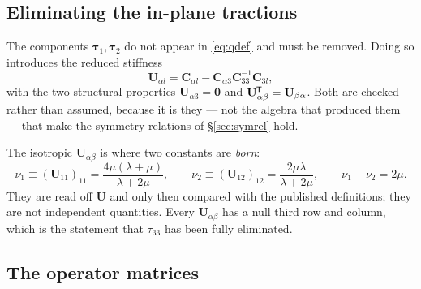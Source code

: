 \documentclass[11pt,a4paper]{article}
\newcommand{\bC}{\mathbf{C}}
\newcommand{\bU}{\mathbf{U}}
\newcommand{\bta}{\boldsymbol{\tau}}
\newcommand{\tp}{^{\mkern-1.5mu\mathsf{T}}}
\begin{document}
\subsection{Eliminating the in-plane tractions}

The components $\bta_1,\bta_2$ do not appear in \eqref{eq:qdef} and must be
removed.  Doing so introduces the reduced stiffness
\begin{equation}\label{eq:U}
  \bU_{\alpha l} = \bC_{\alpha l} - \bC_{\alpha 3}\bC_{33}^{-1}\bC_{3l},
\end{equation}
with the two structural properties $\bU_{\alpha 3} = \mathbf{0}$ and
$\bU_{\alpha\beta}\tp = \bU_{\beta\alpha}$.  Both are checked rather than
assumed, because it is they --- not the algebra that produced them --- that make
the symmetry relations of \S\ref{sec:symrel} hold.

The isotropic $\bU_{\alpha\beta}$ is where two constants are \emph{born}:
\begin{equation}\label{eq:nu}
  \nu_1 \equiv (\bU_{11})_{11} = \frac{4\mu(\lambda+\mu)}{\lambda+2\mu},
  \qquad
  \nu_2 \equiv (\bU_{12})_{12} = \frac{2\mu\lambda}{\lambda+2\mu},
  \qquad
  \nu_1 - \nu_2 = 2\mu .
\end{equation}
They are read off $\bU$ and only then compared with the published definitions;
they are not independent quantities.  Every $\bU_{\alpha\beta}$ has a null third
row and column, which is the statement that $\tau_{33}$ has been fully
eliminated.

\subsection{The operator matrices}
\end{document}
